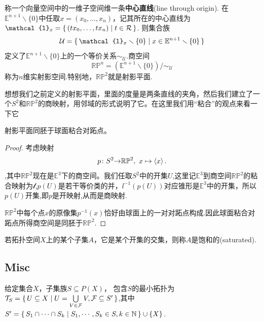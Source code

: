 \begin{definition}
称一个向量空间中的一维子空间维一条\textbf{中心直线}(line through origin). 在$\mathbb{E}^{n+1} \smallsetminus \{0\}$中任取$x=(x_0,\ldots,x_n)$，记其所在的中心直线为$\mathcal{l}_x=\Set{(tx_0,\ldots,tx_n)}{t \in \mathcal{R}}$. 则集合族\[\mathcal{U} = \Set{\mathcal{l}_x \smallsetminus \{0\} }{x \in \mathbb{E}^{n+1} \smallsetminus \{0\}}\]定义了$\mathbb{E}^{n+1} \smallsetminus \{0\}$上的一个等价关系$\sim_{\mathcal{U}}$.商空间\[\mathbb{R}\mathbb{P}^n=(\mathbb{E}^{n+1} \smallsetminus \{0\}) / \sim_{\mathcal{U}}\]称为$n$维实射影空间.特别地，$\mathbb{R}\mathbb{P}^2$就是射影平面.
\end{definition}

想想我们之前定义的射影平面，里面的度量是两条直线的夹角，然后我们建立了一个$S^2$和$\mathbb{R}\mathbb{P}^2$的商映射，用邻域的形式说明了它。在这里我们用“粘合”的观点来看一下它

\begin{example}
射影平面同胚于球面粘合对跖点。
\begin{proof}
考虑映射\[{p}\colon{S^2}{\to}{\mathbb{R}\mathbb{P}^2},\ x \mapsto \left< x \right>.\],其中$\mathbb{R}\mathbb{P}^2$现在是$\mathbb{E}^3$下的商空间。我们任取$S^2$中的开集$U$,这里记$\mathbb{E}^3$到商空间$\mathbb{R}\mathbb{P}^2$的粘合映射为$\mathcal{l}$,$p(U)$是若干等价类的并，$l^{-1}(p(U))$对应锥形是$\mathbb{E}^3$中的开集，所以$p(U)$开集,即$p$是开映射,从而是商映射.

$\mathbb{R}\mathbb{P}^2$中每个点$x$的原像集$p^{-1}(x)$恰好由球面上的一对对跖点构成.因此球面粘合对跖点所得商空间是同胚于$\mathbb{R}\mathbb{P}^2$.
\end{proof}
\end{example}

\begin{definition}
若拓扑空间$X$上的某个子集$A$，它是某个开集的交集，则称$A$是饱和的(saturated).
\end{definition}

\newpage
\subsection{Misc}

\begin{proposition}
给定集合$X$，子集族$S \subseteq P(X)$， 包含$S$的最小拓扑为$\mathcal{T}_S = \{\,U \subseteq X\mid U = \bigcup\limits_{V \in \mathcal{F}} V, \mathcal{F} \subseteq S'\,\}$,其中$S' = \{\,S_1 \cap \cdots \cap S_k\mid S_1,\cdots,S_k \in S, k \in \mathbb{N}\,\} \cup \{X\}$.
\end{proposition}

